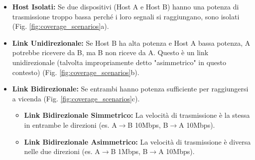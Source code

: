 \begin{itemize}
    \item \textbf{Host Isolati:} Se due dispositivi (Host A e Host B) hanno una potenza di trasmissione troppo bassa perché i loro segnali si raggiungano, sono isolati (Fig. \ref{fig:coverage_scenarios}a).
    \item \textbf{Link Unidirezionale:} Se Host B ha alta potenza e Host A bassa potenza, A potrebbe ricevere da B, ma B non riceve da A. Questo è un link unidirezionale (talvolta impropriamente detto "asimmetrico" in questo contesto) (Fig. \ref{fig:coverage_scenarios}b).
    \item \textbf{Link Bidirezionale:} Se entrambi hanno potenza sufficiente per raggiungersi a vicenda (Fig. \ref{fig:coverage_scenarios}c).
    \begin{itemize}
        \item \textbf{Link Bidirezionale Simmetrico:} La velocità di trasmissione è la stessa in entrambe le direzioni (es. A$\rightarrow$B 10Mbps, B$\rightarrow$A 10Mbps).
        \item \textbf{Link Bidirezionale Asimmetrico:} La velocità di trasmissione è diversa nelle due direzioni (es. A$\rightarrow$B 1Mbps, B$\rightarrow$A 10Mbps).
    \end{itemize}
\end{itemize}

